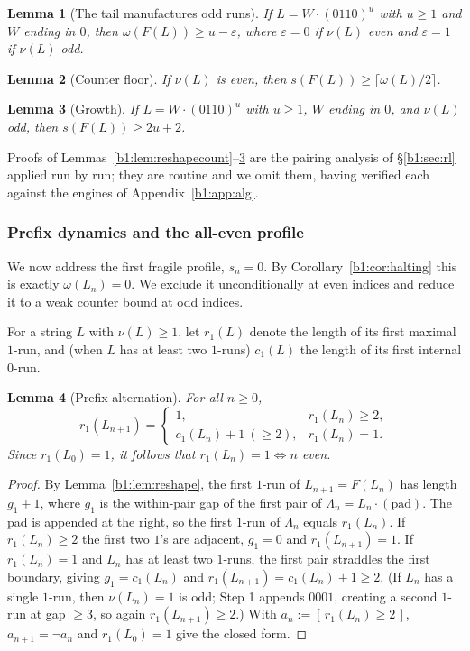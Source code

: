 \documentclass[a4paper]{article}
\theoremstyle{plain}
\newtheorem{lemma}{Lemma}[subsection]
\theoremstyle{definition}
\theoremstyle{remark}
\begin{document}
\begin{lemma}[The tail manufactures odd runs]\label{b1:lem:tailodd}
If $L=W\cdot(0110)^u$ with $u\ge 1$ and $W$ ending in $0$, then $\omega(F(L))\ge u-\varepsilon$, where $\varepsilon=0$ if $\nu(L)$ even and $\varepsilon=1$ if $\nu(L)$ odd.
\end{lemma}

\begin{lemma}[Counter floor]\label{b1:lem:cfloor}
If $\nu(L)$ is even, then $s(F(L))\ge\lceil\omega(L)/2\rceil$.
\end{lemma}

\begin{lemma}[Growth]\label{b1:lem:growth}
If $L=W\cdot(0110)^u$ with $u\ge 1$, $W$ ending in $0$, and $\nu(L)$ odd, then $s(F(L))\ge 2u+2$.
\end{lemma}

Proofs of Lemmas~\ref{b1:lem:reshapecount}--\ref{b1:lem:growth} are the pairing analysis of \S\ref{b1:sec:rl} applied run by run; they are routine and we omit them, having verified each against the engines of Appendix~\ref{b1:app:alg}.

\subsubsection{Prefix dynamics and the all-even profile}\label{b1:sec:prefix}
We now address the first fragile profile, $s_n=0$. By Corollary~\ref{b1:cor:halting} this is exactly $\omega(L_n)=0$. We exclude it unconditionally at even indices and reduce it to a weak counter bound at odd indices.

For a string $L$ with $\nu(L)\ge 1$, let $r_1(L)$ denote the length of its first maximal $1$-run, and (when $L$ has at least two $1$-runs) $c_1(L)$ the length of its first internal $0$-run.

\begin{lemma}[Prefix alternation]\label{b1:lem:prefix}
For all $n\ge 0$,
\[ r_1(L_{n+1})=\begin{cases}1,& r_1(L_n)\ge 2,\\ c_1(L_n)+1\ (\ge 2),& r_1(L_n)=1.\end{cases} \]
Since $r_1(L_0)=1$, it follows that $r_1(L_n)=1\iff n$ even.
\end{lemma}
\begin{proof}
By Lemma~\ref{b1:lem:reshape}, the first $1$-run of $L_{n+1}=F(L_n)$ has length $g_1+1$, where $g_1$ is the within-pair gap of the first pair of $\Lambda_n=L_n\cdot(\mathrm{pad})$. The pad is appended at the right, so the first $1$-run of $\Lambda_n$ equals $r_1(L_n)$. If $r_1(L_n)\ge 2$ the first two $1$'s are adjacent, $g_1=0$ and $r_1(L_{n+1})=1$. If $r_1(L_n)=1$ and $L_n$ has at least two $1$-runs, the first pair straddles the first boundary, giving $g_1=c_1(L_n)$ and $r_1(L_{n+1})=c_1(L_n)+1\ge 2$. (If $L_n$ has a single $1$-run, then $\nu(L_n)=1$ is odd; Step 1 appends $0001$, creating a second $1$-run at gap $\ge 3$, so again $r_1(L_{n+1})\ge 2$.) With $a_n:=[\,r_1(L_n)\ge 2\,]$, $a_{n+1}=\lnot a_n$ and $r_1(L_0)=1$ give the closed form.
\end{proof}
\end{document}
